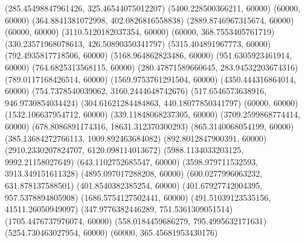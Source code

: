 {(285.45498847961426, 325.46544075012207) %
(5400.228500366211, 60000) %
(60000, 60000) %
(364.8841381072998, 402.0826816558838) %
(2889.8746967315674, 60000) %
(60000, 60000) %
(3110.5120182037354, 60000) %
(60000, 368.7553405761719) %
(330.23571968078613, 426.50890350341797) %
(5315.404891967773, 60000) %
(792.4935817718506, 60000) %
(5168.964862823486, 60000) %
(951.6305923461914, 60000) %
(764.6825313568115, 60000) %
(280.47871589660645, 283.94532203674316) %
(789.0117168426514, 60000) %
(1569.9753761291504, 60000) %
(4350.444316864014, 60000) %
(754.7378540039062, 3160.2444648742676) %
(517.6546573638916, 946.9730854034424) %
(304.61621284484863, 440.18077850341797) %
(60000, 60000) %
(1532.106637954712, 60000) %
(339.11848068237305, 60000) %
(3709.2599868774414, 60000) %
(678.8086891174316, 18631.312370300293) %
(865.3140068054199, 60000) %
(385.13684272766113, 1009.892463684082) %
(892.8012847900391, 60000) %
(2910.2330207824707, 6120.098114013672) %
(5988.1134033203125, 9992.21158027649) %
(643.1102752685547, 60000) %
(3598.979711532593, 3913.349151611328) %
(4895.097017288208, 60000) %
(600.0277996063232, 631.878137588501) %
(401.8540382385254, 60000) %
(401.67927742004395, 957.5378894805908) %
(1686.5754127502441, 60000) %
(491.51039123535156, 41511.26050949097) %
(347.9776382446289, 751.5361309051514) %
(1705.4476737976074, 60000) %
(558.0184459686279, 795.4995632171631) %
(5254.730463027954, 60000) %
(60000, 365.45681953430176) %
}
